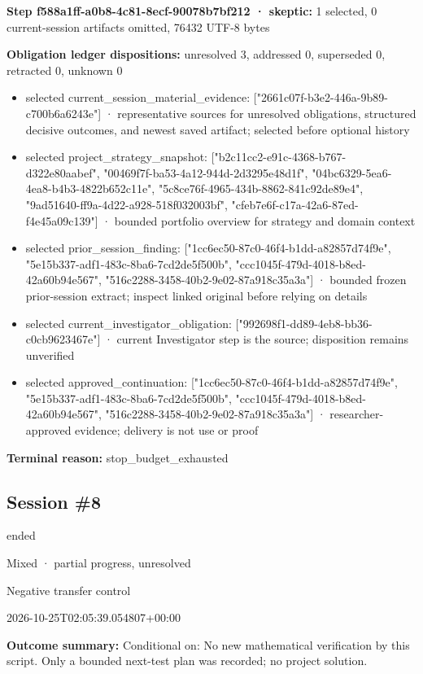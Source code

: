 \documentclass[11pt]{article}
\begin{document}
\textbf{Step f588a1ff-a0b8-4c81-8ecf-90078b7bf212 · skeptic:} 1 selected, 0 current-session artifacts omitted, 76432 UTF-8 bytes\par
\textbf{Obligation ledger dispositions:} unresolved 3, addressed 0, superseded 0, retracted 0, unknown 0\par
\begin{itemize}
\item selected current\_session\_material\_evidence: ["2661c07f-b3e2-446a-9b89-c700b6a6243e"] · representative sources for unresolved obligations, structured decisive outcomes, and newest saved artifact; selected before optional history
\item selected project\_strategy\_snapshot: ["b2c11cc2-e91c-4368-b767-d322e80aabef", "00469f7f-ba53-4a12-944d-2d3295e48d1f", "04bc6329-5ea6-4ea8-b4b3-4822b652c11e", "5c8ce76f-4965-434b-8862-841c92de89e4", "9ad51640-ff9a-4d22-a928-518f032003bf", "cfeb7e6f-c17a-42a6-87ed-f4e45a09c139"] · bounded portfolio overview for strategy and domain context
\item selected prior\_session\_finding: ["1cc6ec50-87c0-46f4-b1dd-a82857d74f9e", "5e15b337-adf1-483c-8ba6-7cd2de5f500b", "ccc1045f-479d-4018-b8ed-42a60b94e567", "516c2288-3458-40b2-9e02-87a918c35a3a"] · bounded frozen prior-session extract; inspect linked original before relying on details
\item selected current\_investigator\_obligation: ["992698f1-dd89-4eb8-bb36-c0cb9623467e"] · current Investigator step is the source; disposition remains unverified
\item selected approved\_continuation: ["1cc6ec50-87c0-46f4-b1dd-a82857d74f9e", "5e15b337-adf1-483c-8ba6-7cd2de5f500b", "ccc1045f-479d-4018-b8ed-42a60b94e567", "516c2288-3458-40b2-9e02-87a918c35a3a"] · researcher-approved evidence; delivery is not use or proof
\end{itemize}
\textbf{Terminal reason:} stop\_budget\_exhausted\par
\subsection{Session \#8}
\begin{description}[style=nextline,font=\normalfont\bfseries,leftmargin=0pt,labelsep=0pt]
\item[Execution status] ended
\item[Outcome] Mixed · partial progress, unresolved
\item[Strategy] Negative transfer control
\item[Started] 2026-10-25T02:05:39.054807+00:00
\end{description}
\textbf{Outcome summary:} Conditional on: No new mathematical verification by this script. Only a bounded next-test plan was recorded; no project solution.\par
\end{document}
